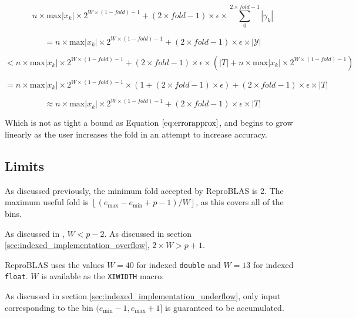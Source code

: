 \documentclass[12pt]{article}
\providecommand{\floor}[1]{\left \lfloor #1 \right \rfloor }
\providecommand{\min}{\ensuremath{\text{min}}}
\providecommand{\max}{\ensuremath{\text{max}}}
\theoremstyle{plain}
\numberwithin{equation}{section}
\begin{document}
    \begin{equation*}
    n \times \max|x_k|\times 2^{W \times (1 - fold) - 1} + (2 \times fold - 1) \times \epsilon \times \sum\limits_0^{2 \times fold - 1}|\gamma_k|
    \end{equation*}

    \begin{equation*}
    = n \times \max|x_k|\times 2^{W \times (1 - fold) - 1} + (2 \times fold - 1) \times \epsilon \times |\mathcal{Y}|
    \end{equation*}

    \begin{equation*}
    < n \times \max|x_k|\times 2^{W \times (1 - fold) - 1} + (2 \times fold - 1) \times \epsilon \times (|T| + n \times \max|x_k|\times 2^{W \times (1 - fold) - 1})
    \end{equation*}

    \begin{equation*}
    = n \times \max|x_k|\times 2^{W \times (1 - fold) - 1}\times (1 + (2 \times fold - 1)\times \epsilon) + (2 \times fold - 1) \times \epsilon \times |T|
    \end{equation*}

    \begin{equation*}
    \approx n \times \max|x_k|\times 2^{W \times (1 - fold) - 1} + (2 \times fold - 1) \times \epsilon \times |T|
    \end{equation*}

    Which is not as tight a bound as Equation $\ref{eq:errorapprox}$, and begins to grow linearly as the user increases the fold in an attempt to increase accuracy.

  \subsection{Limits}
    \label{sec:limits}
    As discussed previously, the minimum fold accepted by ReproBLAS is 2. The maximum useful fold is $\floor{(e_{\max} - e_{\min} + p - 1)/W}$, as this covers all of the bins.

    As discussed in \cite{repsum}, $W < p - 2$. As discussed in section \ref{sec:indexed_implementation_overflow}, $2\times W > p + 1$.

    ReproBLAS uses the values $W = 40$ for indexed \verb|double| and $W = 13$ for indexed \verb|float|. $W$ is available as the \verb|XIWIDTH| macro.

    As discussed in section \ref{sec:indexed_implementation_underflow}, only input corresponding to the bin $(e_{\min} - 1, e_{\max} + 1]$ is guaranteed to be accumulated.
\end{document}
